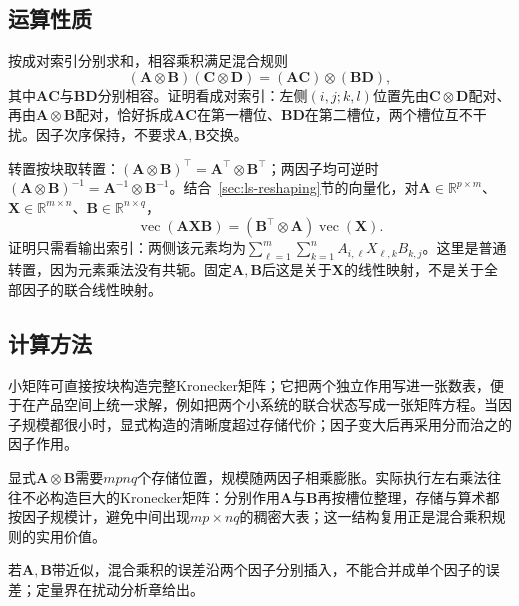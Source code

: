 \subsection{运算性质}

按成对索引分别求和，相容乘积满足混合规则
\begin{equation}
 (\bm A\otimes\bm B)(\bm C\otimes\bm D)
 =(\bm A\bm C)\otimes(\bm B\bm D),
 \label{eq:matrix-analysis-kronecker-mixed-product}
\end{equation}
其中$\bm A\bm C$与$\bm B\bm D$分别相容。证明看成对索引：左侧$(i,j;k,l)$位置先由$\bm C\otimes\bm D$配对、再由$\bm A\otimes\bm B$配对，恰好拆成$\bm A\bm C$在第一槽位、$\bm B\bm D$在第二槽位，两个槽位互不干扰。因子次序保持，不要求$\bm A,\bm B$交换。

转置按块取转置：$(\bm A\otimes\bm B)^\top=\bm A^\top\otimes\bm B^\top$；两因子均可逆时$(\bm A\otimes\bm B)^{-1}=\bm A^{-1}\otimes\bm B^{-1}$。结合~\ref{sec:ls-reshaping}节的向量化，对$\bm A\in\mathbb R^{p\times m}$、$\bm X\in\mathbb R^{m\times n}$、$\bm B\in\mathbb R^{n\times q}$，
\begin{equation}
 \operatorname{vec}(\bm A\bm X\bm B)
 =(\bm B^\top\otimes\bm A)\operatorname{vec}(\bm X).
 \label{eq:matrix-analysis-vec-kronecker}
\end{equation}
证明只需看输出索引：两侧该元素均为$\sum_{\ell=1}^m\sum_{k=1}^n A_{i,\ell}X_{\ell,k}B_{k,j}$。这里是普通转置，因为元素乘法没有共轭。固定$\bm A,\bm B$后这是关于$\bm X$的线性映射，不是关于全部因子的联合线性映射。

\subsection{计算方法}

小矩阵可直接按块构造完整Kronecker矩阵；它把两个独立作用写进一张数表，便于在产品空间上统一求解，例如把两个小系统的联合状态写成一张矩阵方程。当因子规模都很小时，显式构造的清晰度超过存储代价；因子变大后再采用分而治之的因子作用。

显式$\bm A\otimes\bm B$需要$mpnq$个存储位置，规模随两因子相乘膨胀。实际执行左右乘法往往不必构造巨大的Kronecker矩阵：分别作用$\bm A$与$\bm B$再按槽位整理，存储与算术都按因子规模计，避免中间出现$mp\times nq$的稠密大表；这一结构复用正是混合乘积规则的实用价值。

若$\bm A,\bm B$带近似，混合乘积的误差沿两个因子分别插入，不能合并成单个因子的误差；定量界在扰动分析章给出。

